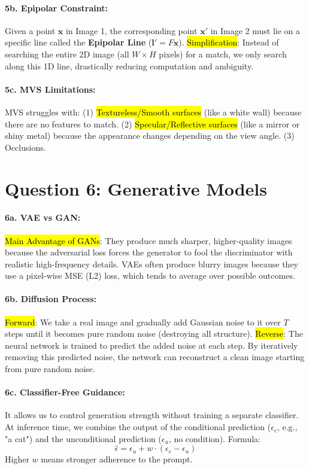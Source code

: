 \documentclass[11pt]{article}
\begin{document}
\paragraph{5b. Epipolar Constraint:}
Given a point $\mathbf{x}$ in Image 1, the corresponding point $\mathbf{x}'$ in Image 2 must lie on a specific line called the \textbf{Epipolar Line} ($\mathbf{l}' = F\mathbf{x}$). 
\hl{Simplification}: Instead of searching the entire 2D image (all $W \times H$ pixels) for a match, we only search along this 1D line, drastically reducing computation and ambiguity.

\paragraph{5c. MVS Limitations:}
MVS struggles with: (1) \hl{Textureless/Smooth surfaces} (like a white wall) because there are no features to match. (2) \hl{Specular/Reflective surfaces} (like a mirror or shiny metal) because the appearance changes depending on the view angle. (3) Occlusions.

\section*{Question 6: Generative Models}

\paragraph{6a. VAE vs GAN:}
\hl{Main Advantage of GANs}: They produce much sharper, higher-quality images because the adversarial loss forces the generator to fool the discriminator with realistic high-frequency details. VAEs often produce blurry images because they use a pixel-wise MSE (L2) loss, which tends to average over possible outcomes.

\paragraph{6b. Diffusion Process:}
\hl{Forward}: We take a real image and gradually add Gaussian noise to it over $T$ steps until it becomes pure random noise (destroying all structure).
\hl{Reverse}: The neural network is trained to predict the added noise at each step. By iteratively removing this predicted noise, the network can reconstruct a clean image starting from pure random noise.

\paragraph{6c. Classifier-Free Guidance:}
It allows us to control generation strength without training a separate classifier. At inference time, we combine the output of the conditional prediction ($\epsilon_c$, e.g., "a cat") and the unconditional prediction ($\epsilon_u$, no condition).
Formula:
\[ \hat{\epsilon} = \epsilon_u + w \cdot (\epsilon_c - \epsilon_u) \]
Higher $w$ means stronger adherence to the prompt.
\end{document}
